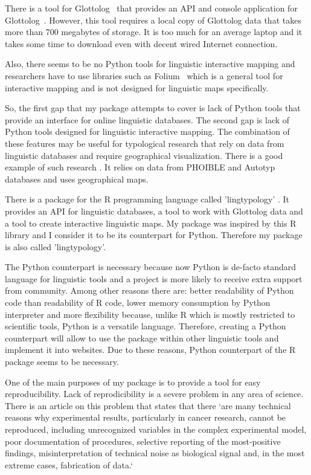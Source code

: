 \documentclass[a4paper,12pt]{article}
\begin{document}
There is a tool for Glottolog~\parencite{HaraldHammarstrom2019} that provides an API and console application for Glottolog~\parencite{Robert2Forkel2019}. However, this tool requires a local copy of Glottolog data that takes more than 700 megabytes of storage. It is too much for an average laptop and it takes some time to download even with decent wired Internet connection.

Also, there seems to be no Python tools for linguistic interactive mapping and researchers have to use libraries such as Folium~\parencite{folium} which is a general tool for interactive mapping and is not designed for linguistic maps specifically.

So, the first gap that my package attempts to cover is lack of Python tools that provide an interface for online linguistic databases. The second gap is lack of Python tools designed for linguistic interactive mapping. The combination of these features may be useful for typological research that rely on data from linguistic databases and require geographical visualization. There is a good example of such research \parencite{Blasieaav3218}. It relies on data from PHOIBLE \parencite{phoible} and Autotyp \parencite{autotyp} databases and uses geographical maps.

There is a package for the R programming language called 'lingtypology' \parencite{GeorgeMoroz2018}. It provides an API for linguistic databases, a tool to work with Glottolog data and a tool to create interactive linguistic maps. My package was inspired by this R library and I consider it to be its counterpart for Python. Therefore my package is also called 'lingtypology'. 

The Python counterpart is necessary because now Python is de-facto standard language for linguistic tools and a project is more likely to receive extra support from community. Among other reasons there are: better readability of Python code than readability of R code, lower memory consumption by Python interpreter and more flexibility because, unlike R which is mostly restricted to scientific tools, Python is a versatile language. Therefore, creating a Python counterpart will allow to use the package within other linguistic tools and implement it into websites. Due to these reasons, Python counterpart of the R package seems to be necessary.

One of the main purposes of my package is to provide a tool for easy reproducibility. Lack of reprodicibility is a severe problem in any area of science. There is an article on this problem that states that there `are many technical reasons why experimental results, particularly in cancer research, cannot be reproduced, including unrecognized variables in the complex experimental model, 
poor documentation of procedures, selective reporting of the most-positive findings, 
misinterpretation of technical noise as biological signal and, in the most extreme 
cases, fabrication of data.`~\parencite{Pusztai2013}
\end{document}
